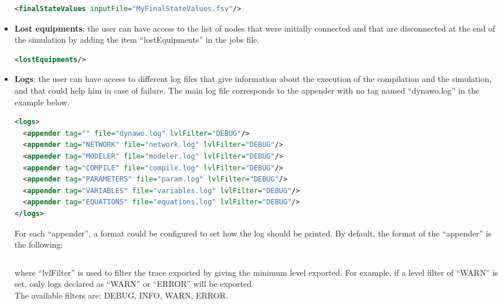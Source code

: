 \documentclass[a4paper, 12pt]{report}
\begin{document}
\begin{itemize}
\begin{lstlisting}[language=XML, morekeywords={finalStateValues},numbers=none]
<finalStateValues inputFile="MyFinalStateValues.fsv"/>
\end{lstlisting}

\item \textbf{Lost equipments}:  the user can have access to the list of nodes that were initially connected and that are disconnected at the end of the simulation by adding the item ``lostEquipments'' in the jobs file.

\begin{lstlisting}[language=XML, morekeywords={lostEquipments},numbers=none]
<lostEquipments/>
\end{lstlisting}

\item \textbf{Logs}: the user can have access to different log files that give information about the execution of the compilation and the simulation, and that could help him in case of failure. The main log file corresponds to the appender with no tag named ``dynawo.log'' in the example below.
\begin{lstlisting}[language=XML, morekeywords={logs}]
<logs>
  <appender tag="" file="dynawo.log" lvlFilter="DEBUG"/>
  <appender tag="NETWORK" file="network.log" lvlFilter="DEBUG"/>
  <appender tag="MODELER" file="modeler.log" lvlFilter="DEBUG"/>
  <appender tag="COMPILE" file="compile.log" lvlFilter="DEBUG"/>
  <appender tag="PARAMETERS" file="param.log" lvlFilter="DEBUG"/>
  <appender tag="VARIABLES" file="variables.log" lvlFilter="DEBUG"/>
  <appender tag="EQUATIONS" file="equations.log" lvlFilter="DEBUG"/>
</logs>
\end{lstlisting}

For each ``appender'', a format could be configured to set how the log should be printed. By default, the format of the ``appender'' is the following:
\begin{lstlisting}[numbers=none]
%Y-%m-%d %H:%M:%S | <lvlFilter> | log
\end{lstlisting}

where ``lvlFilter'' is used to filter the trace exported by giving the minimum level exported. For example, if a level filter of ``WARN'' is set, only logs declared as ``WARN'' or ``ERROR'' will be exported. \\

The available filters are: DEBUG, INFO, WARN, ERROR.
\end{itemize}
\end{document}
